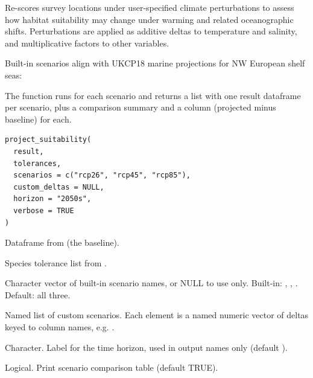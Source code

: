 \documentclass[a4paper]{book}
\begin{document}
%
\begin{Description}
Re-scores survey locations under user-specified climate perturbations to
assess how habitat suitability may change under warming and related
oceanographic shifts. Perturbations are applied as additive deltas to
temperature and salinity, and multiplicative factors to other variables.

Built-in scenarios align with UKCP18 marine projections for NW European
shelf seas:


The function runs  for each scenario and returns a list
with one result dataframe per scenario, plus a comparison summary and a
 column (projected minus baseline) for each.
\end{Description}
%
\begin{Usage}
\begin{verbatim}
project_suitability(
  result,
  tolerances,
  scenarios = c("rcp26", "rcp45", "rcp85"),
  custom_deltas = NULL,
  horizon = "2050s",
  verbose = TRUE
)
\end{verbatim}
\end{Usage}
%
\begin{Arguments}
\begin{ldescription}
\item[\code{result}] Dataframe from  (the baseline).

\item[\code{tolerances}] Species tolerance list from .

\item[\code{scenarios}] Character vector of built-in scenario names, or NULL to
use  only. Built-in: , , .
Default: all three.

\item[\code{custom\_deltas}] Named list of custom scenarios. Each element is a
named numeric vector of deltas keyed to column names, e.g.
.

\item[\code{horizon}] Character. Label for the time horizon, used in output names
only (default ).

\item[\code{verbose}] Logical. Print scenario comparison table (default TRUE).
\end{ldescription}
\end{Arguments}
\end{document}
